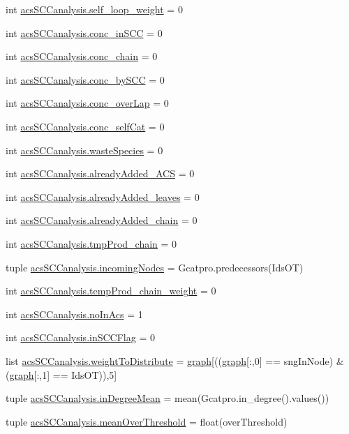 \begin{DoxyCompactItemize}
\item 
int \hyperlink{a00096_ae9790fbc87f233c94224436a9cbd59c1}{acs\-S\-C\-Canalysis.\-self\-\_\-loop\-\_\-weight} = 0
\item 
int \hyperlink{a00096_a3fcb8f9c7e88b5c53f1201a383b38666}{acs\-S\-C\-Canalysis.\-conc\-\_\-in\-S\-C\-C} = 0
\item 
int \hyperlink{a00096_a3188cc39362e42ecb36d23a98f2b5a78}{acs\-S\-C\-Canalysis.\-conc\-\_\-chain} = 0
\item 
int \hyperlink{a00096_aac2f508d526d62bd7f9d4f5a5f8b1821}{acs\-S\-C\-Canalysis.\-conc\-\_\-by\-S\-C\-C} = 0
\item 
int \hyperlink{a00096_afd3169174539244248b78c8da2bba265}{acs\-S\-C\-Canalysis.\-conc\-\_\-over\-Lap} = 0
\item 
int \hyperlink{a00096_a9e8cc07f7d7f892f3f72274318dcbcef}{acs\-S\-C\-Canalysis.\-conc\-\_\-self\-Cat} = 0
\item 
int \hyperlink{a00096_ace0de61f3c6aa14b4197156be3a68280}{acs\-S\-C\-Canalysis.\-waste\-Species} = 0
\item 
int \hyperlink{a00096_a38f20e6b1cad6a61f1c9b87b37c76f63}{acs\-S\-C\-Canalysis.\-already\-Added\-\_\-\-A\-C\-S} = 0
\item 
int \hyperlink{a00096_ac842390795cf193351c795945cde8e77}{acs\-S\-C\-Canalysis.\-already\-Added\-\_\-leaves} = 0
\item 
int \hyperlink{a00096_ac1b286545469555eb284f9b5f2bd984f}{acs\-S\-C\-Canalysis.\-already\-Added\-\_\-chain} = 0
\item 
int \hyperlink{a00096_aee6b4f50387d471b70458cf703c0863b}{acs\-S\-C\-Canalysis.\-tmp\-Prod\-\_\-chain} = 0
\item 
tuple \hyperlink{a00096_a540ba5319ee67d8a2323099dad73ba36}{acs\-S\-C\-Canalysis.\-incoming\-Nodes} = Gcatpro.\-predecessors(Ids\-O\-T)
\item 
int \hyperlink{a00096_aaf17c99825e0961e4cfaa173ddfffe84}{acs\-S\-C\-Canalysis.\-temp\-Prod\-\_\-chain\-\_\-weight} = 0
\item 
int \hyperlink{a00096_a4766b3ca835449f1aa287fda699c7f96}{acs\-S\-C\-Canalysis.\-no\-In\-Acs} = 1
\item 
int \hyperlink{a00096_a6405b6b05e7b87812422cc30d2034904}{acs\-S\-C\-Canalysis.\-in\-S\-C\-C\-Flag} = 0
\item 
list \hyperlink{a00096_a5162bfbe5eb2618736d1f77bb3125a9b}{acs\-S\-C\-Canalysis.\-weight\-To\-Distribute} = \hyperlink{a00022_a2745e24fec2a44d51f4452beb1596bd3}{graph}\mbox{[}((\hyperlink{a00022_a2745e24fec2a44d51f4452beb1596bd3}{graph}\mbox{[}\-:,0\mbox{]} == sng\-In\-Node) \& (\hyperlink{a00022_a2745e24fec2a44d51f4452beb1596bd3}{graph}\mbox{[}\-:,1\mbox{]} == Ids\-O\-T)),5\mbox{]}
\item 
tuple \hyperlink{a00096_a5004d18b8cfa2803620a9cd7f32d9775}{acs\-S\-C\-Canalysis.\-in\-Degree\-Mean} = mean(Gcatpro.\-in\-\_\-degree().values())
\item 
tuple \hyperlink{a00096_af10c3623be709892f4bdc4df5a3d52b0}{acs\-S\-C\-Canalysis.\-mean\-Over\-Threshold} = float(over\-Threshold)
\end{DoxyCompactItemize}
